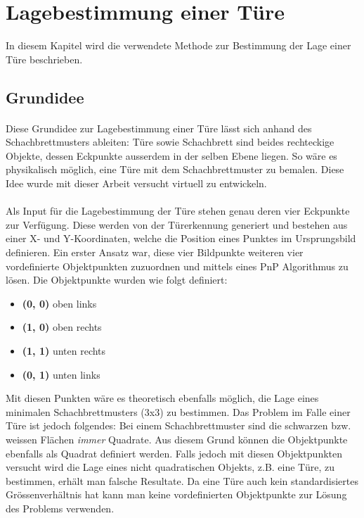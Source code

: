 \section{Lagebestimmung einer Türe}

In diesem Kapitel wird die verwendete Methode zur Bestimmung der Lage einer Türe beschrieben.


\subsection{Grundidee}

\paragraph{}
Diese Grundidee zur Lagebestimmung einer Türe lässt sich anhand des Schachbrettmusters ableiten: Türe sowie Schachbrett sind beides rechteckige Objekte, dessen Eckpunkte ausserdem in der selben Ebene liegen. So wäre es physikalisch möglich, eine Türe mit dem Schachbrettmuster zu bemalen. 
Diese Idee wurde mit dieser Arbeit versucht virtuell zu entwickeln.
\\
\\
Als Input für die Lagebestimmung der Türe stehen genau deren vier Eckpunkte zur Verfügung. Diese werden von der Türerkennung generiert und bestehen aus einer X- und Y-Koordinaten, welche die Position eines Punktes im Ursprungsbild definieren. Ein erster Ansatz war, diese vier Bildpunkte weiteren vier vordefinierte Objektpunkten zuzuordnen und mittels eines PnP Algorithmus zu lösen. Die Objektpunkte wurden wie folgt definiert:

\begin{itemize}
\item \textbf{(0, 0)} oben links
\item \textbf{(1, 0)} oben rechts
\item \textbf{(1, 1)} unten rechts
\item \textbf{(0, 1)} unten links
\end{itemize}
\noindent
Mit diesen Punkten wäre es theoretisch ebenfalls möglich, die Lage eines minimalen Schachbrettmusters (3x3) zu bestimmen. Das Problem im Falle einer Türe ist jedoch folgendes: Bei einem Schachbrettmuster sind die schwarzen bzw. weissen Flächen \textit{immer} Quadrate. Aus diesem Grund können die Objektpunkte ebenfalls als Quadrat definiert werden. Falls jedoch mit diesen Objektpunkten versucht wird die Lage eines nicht quadratischen Objekts, z.B. eine Türe, zu bestimmen, erhält man falsche Resultate. Da eine Türe auch kein standardisiertes Grössenverhältnis hat kann man keine vordefinierten Objektpunkte zur Lösung des Problems verwenden.

